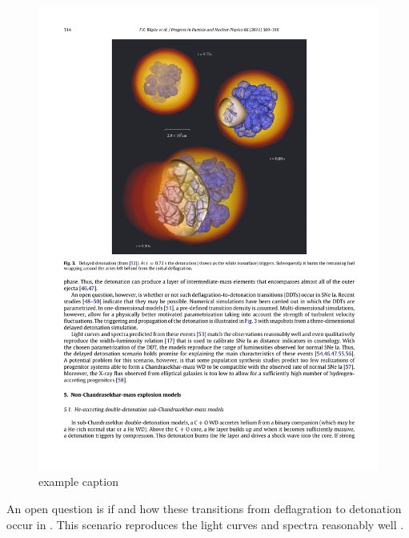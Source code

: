 \begin{figure}[htbp] %
   \centering
   \includegraphics[width=\textwidth]{chapter1/plots/roepke2007.pdf}
   \caption{example caption}
   \label{fig:snia_ddt_roepke2007}
\end{figure}

An open question is if and how these transitions from deflagration to detonation occur in \sneia. This scenario reproduces the light curves and spectra reasonably well \citep{2009Natur.460..869K}. 


